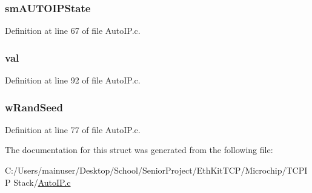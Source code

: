 \hypertarget{struct_a_u_t_o_i_p___c_l_i_e_n_t___v_a_r_s_afc5c2521bc6a87a1c7f5bb988a3af45a}{}
\subsubsection[{sm\+A\+U\+T\+O\+I\+P\+State}]{ sm\+A\+U\+T\+O\+I\+P\+State}\label{struct_a_u_t_o_i_p___c_l_i_e_n_t___v_a_r_s_afc5c2521bc6a87a1c7f5bb988a3af45a}


Definition at line 67 of file Auto\+I\+P.\+c.

\hypertarget{struct_a_u_t_o_i_p___c_l_i_e_n_t___v_a_r_s_a5986ea8162aa0f6608b36b20964044dd}{}
\subsubsection[{val}]{ val}\label{struct_a_u_t_o_i_p___c_l_i_e_n_t___v_a_r_s_a5986ea8162aa0f6608b36b20964044dd}


Definition at line 92 of file Auto\+I\+P.\+c.

\hypertarget{struct_a_u_t_o_i_p___c_l_i_e_n_t___v_a_r_s_a1e454edeeb08929854e4864a764c8f15}{}
\subsubsection[{w\+Rand\+Seed}]{ w\+Rand\+Seed}\label{struct_a_u_t_o_i_p___c_l_i_e_n_t___v_a_r_s_a1e454edeeb08929854e4864a764c8f15}


Definition at line 77 of file Auto\+I\+P.\+c.



The documentation for this struct was generated from the following file\+:\begin{DoxyCompactItemize}
\item 
C\+:/\+Users/mainuser/\+Desktop/\+School/\+Senior\+Project/\+Eth\+Kit\+T\+C\+P/\+Microchip/\+T\+C\+P\+I\+P Stack/\hyperlink{_auto_i_p_8c}{Auto\+I\+P.\+c}\end{DoxyCompactItemize}

